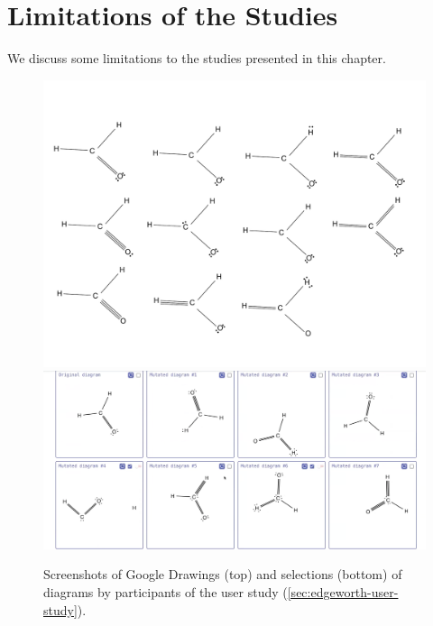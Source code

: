\section{Limitations of the Studies}

We discuss some limitations to the studies presented in this chapter. 


\begin{figure}[t]
    \centering
    \includegraphics[width=\linewidth]{assets/edgeworth-eval/p4-drawings.pdf}
    \includegraphics[width=\linewidth]{assets/edgeworth-eval/p4-edgeworth.png}
    \caption{Screenshots of Google Drawings (top) and \Edgeworth selections (bottom) of diagrams by participants of the user study (\cref{sec:edgeworth-user-study}).}
    \label{fig:edgeworth-user-study-shortcuts}
\end{figure}


